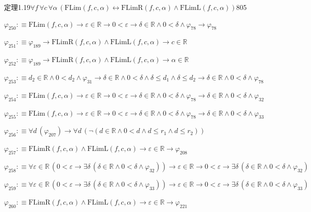 \begin{fullproof}{定理1.19}{$\forall f\,\forall c\,\forall \alpha\,(\mathrm{FLim}(f,c,\alpha) \leftrightarrow \mathrm{FLimR}(f,c,\alpha) \land \mathrm{FLimL}(f,c,\alpha))$}{805}
\begin{abbrevlist}
\item $\varphi_{250} :\equiv \mathrm{FLim}(f,c,\alpha) \to \varepsilon \in \mathbb{R} \to 0 < \varepsilon \to \delta \in \mathbb{R} \land 0 < \delta \land \varphi_{78} \to \varphi_{78}$
\item $\varphi_{251} :\equiv \varphi_{189} \to \mathrm{FLimR}(f,c,\alpha) \land \mathrm{FLimL}(f,c,\alpha) \to c \in \mathbb{R}$
\item $\varphi_{252} :\equiv \varphi_{189} \to \mathrm{FLimR}(f,c,\alpha) \land \mathrm{FLimL}(f,c,\alpha) \to \alpha \in \mathbb{R}$
\item $\varphi_{253} :\equiv d_{2} \in \mathbb{R} \land 0 < d_{2} \land \varphi_{31} \to \delta \in \mathbb{R} \land 0 < \delta \land \delta \leq d_{1} \land \delta \leq d_{2} \to \delta \in \mathbb{R} \land 0 < \delta \land \varphi_{78}$
\item $\varphi_{254} :\equiv \mathrm{FLim}(f,c,\alpha) \to \varepsilon \in \mathbb{R} \to 0 < \varepsilon \to \delta \in \mathbb{R} \land 0 < \delta \land \varphi_{78} \to \delta \in \mathbb{R} \land 0 < \delta \land \varphi_{32}$
\item $\varphi_{255} :\equiv \mathrm{FLim}(f,c,\alpha) \to \varepsilon \in \mathbb{R} \to 0 < \varepsilon \to \delta \in \mathbb{R} \land 0 < \delta \land \varphi_{78} \to \delta \in \mathbb{R} \land 0 < \delta \land \varphi_{33}$
\item $\varphi_{256} :\equiv \forall d\,(\varphi_{207}) \to \forall d\,(\neg (d \in \mathbb{R} \land 0 < d \land d \leq r_{1} \land d \leq r_{2}))$
\item $\varphi_{257} :\equiv \mathrm{FLimR}(f,c,\alpha) \land \mathrm{FLimL}(f,c,\alpha) \to \varepsilon \in \mathbb{R} \to \varphi_{208}$
\item $\varphi_{258} :\equiv \forall \varepsilon \in \mathbb{R}\,(0 < \varepsilon \to \exists \delta\,(\delta \in \mathbb{R} \land 0 < \delta \land \varphi_{32})) \to \varepsilon \in \mathbb{R} \to 0 < \varepsilon \to \exists \delta\,(\delta \in \mathbb{R} \land 0 < \delta \land \varphi_{32})$
\item $\varphi_{259} :\equiv \forall \varepsilon \in \mathbb{R}\,(0 < \varepsilon \to \exists \delta\,(\delta \in \mathbb{R} \land 0 < \delta \land \varphi_{33})) \to \varepsilon \in \mathbb{R} \to 0 < \varepsilon \to \exists \delta\,(\delta \in \mathbb{R} \land 0 < \delta \land \varphi_{33})$
\item $\varphi_{260} :\equiv \mathrm{FLimR}(f,c,\alpha) \land \mathrm{FLimL}(f,c,\alpha) \to \varepsilon \in \mathbb{R} \to \varphi_{221}$

\end{abbrevlist}
\end{fullproof}
